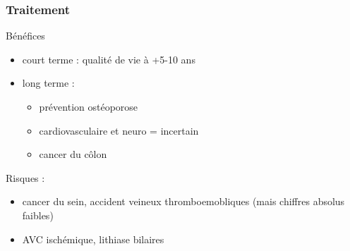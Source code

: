 \documentclass[11pt]{article}
\begin{document}
\subsubsection{Traitement}
\label{sec:org5c0f7e8}
Bénéfices
\begin{itemize}
\item court terme : qualité de vie à +5-10 ans
\item long terme :
\begin{itemize}
\item prévention ostéoporose
\item cardiovasculaire et neuro = incertain
\item cancer du côlon
\end{itemize}
\end{itemize}
Risques :
\begin{itemize}
\item \inc cancer du sein, accident veineux thromboemobliques (mais chiffres absolus
faibles)
\item \inc AVC ischémique, lithiase bilaires
\end{itemize}
\end{document}
